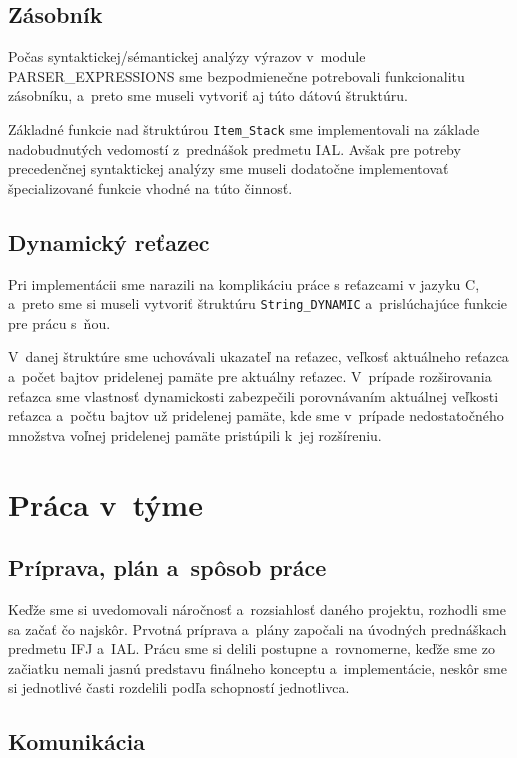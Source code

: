 \documentclass[a4paper, 11pt]{article}
\begin{document}
\subsection{Zásobník}

Počas syntaktickej/sémantickej analýzy výrazov v~module PARSER\_EXPRESSIONS sme bezpodmienečne potrebovali funkcionalitu zásobníku, a~preto sme museli vytvoriť aj túto dátovú štruktúru.

Základné funkcie nad štruktúrou \texttt{Item\_Stack} sme implementovali na základe nadobudnutých vedomostí z~prednášok predmetu IAL. Avšak pre potreby precedenčnej syntaktickej analýzy sme museli dodatočne implementovať špecializované funkcie vhodné na túto činnosť. 

\subsection{Dynamický reťazec}
Pri implementácii sme narazili na komplikáciu práce s reťazcami v jazyku C, a~preto sme si museli vytvoriť štruktúru \texttt{String\_DYNAMIC} a~prislúchajúce funkcie pre prácu s~ňou.

V~danej štruktúre sme uchovávali ukazateľ na reťazec, veľkosť aktuálneho reťazca a~počet bajtov pridelenej pamäte pre aktuálny reťazec. V~prípade rozširovania reťazca sme vlastnosť dynamickosti zabezpečili porovnávaním aktuálnej veľkosti reťazca a~počtu bajtov už pridelenej pamäte, kde sme v~prípade nedostatočného množstva voľnej pridelenej pamäte pristúpili k~jej rozšíreniu. 

\section{Práca v~týme}

\subsection{Príprava, plán a~spôsob práce}

Keďže sme si uvedomovali náročnosť a~rozsiahlosť daného projektu, rozhodli sme sa začať čo najskôr. Prvotná príprava a~plány započali na úvodných prednáškach predmetu IFJ a~IAL. Prácu sme si delili postupne a~rovnomerne, keďže sme zo začiatku nemali jasnú predstavu finálneho konceptu a~implementácie, neskôr sme si jednotlivé časti rozdelili podľa schopností jednotlivca.

\subsection{Komunikácia}
\end{document}
